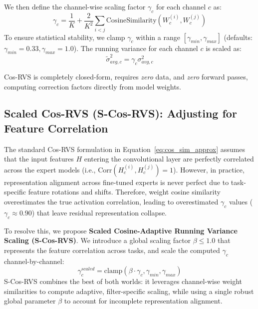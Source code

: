 \documentclass{article}
\theoremstyle{plain}
\theoremstyle{definition}
\theoremstyle{remark}
\begin{document}
We then define the channel-wise scaling factor $\gamma_c$ for each channel $c$ as:
\begin{equation}
    \gamma_c = \frac{1}{K} + \frac{2}{K^2} \sum_{i < j} \text{CosineSimilarity}(W^{(i)}_c, W^{(j)}_c)
\label{eq:cos_rvs_gamma}
\end{equation}
To ensure statistical stability, we clamp $\gamma_c$ within a range $[\gamma_{min}, \gamma_{max}]$ (defaults: $\gamma_{min}=0.33, \gamma_{max}=1.0$). The running variance for each channel $c$ is scaled as:
\begin{equation}
    \tilde{\sigma}^2_{avg, c} = \gamma_c \sigma^2_{avg, c}
\label{eq:cos_rvs}
\end{equation}

Cos-RVS is completely closed-form, requires \emph{zero} data, and \emph{zero} forward passes, computing correction factors directly from model weights.

\subsection{Scaled Cos-RVS (S-Cos-RVS): Adjusting for Feature Correlation}

The standard Cos-RVS formulation in Equation~\ref{eq:cos_sim_approx} assumes that the input features $H$ entering the convolutional layer are perfectly correlated across the expert models (i.e., $\text{Corr}(H^{(i)}_c, H^{(j)}_c) = 1$). However, in practice, representation alignment across fine-tuned experts is never perfect due to task-specific feature rotations and shifts. Therefore, weight cosine similarity overestimates the true activation correlation, leading to overestimated $\gamma_c$ values ($\gamma_c \approx 0.90$) that leave residual representation collapse.

To resolve this, we propose \textbf{Scaled Cosine-Adaptive Running Variance Scaling (S-Cos-RVS)}. We introduce a global scaling factor $\beta \le 1.0$ that represents the feature correlation across tasks, and scale the computed $\gamma_c$ channel-by-channel:
\begin{equation}
    \gamma^{scaled}_c = \text{clamp}(\beta \cdot \gamma_c, \gamma_{min}, \gamma_{max})
\label{eq:scos_rvs}
\end{equation}
S-Cos-RVS combines the best of both worlds: it leverages channel-wise weight similarities to compute adaptive, filter-specific scaling, while using a single robust global parameter $\beta$ to account for incomplete representation alignment.
\end{document}
